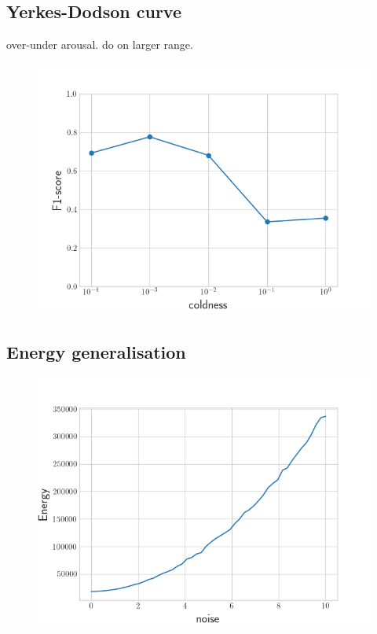 \subsection*{Yerkes-Dodson curve}
over-under arousal. do on larger range.
\begin{figure}[!ht]
\centering
\includegraphics[scale=0.5]{figures/yerkes-dodson}
\end{figure}

\subsection*{Energy generalisation}
\begin{figure}[!ht]
\centering
\includegraphics[scale=0.5]{figures/total-energy-model-1}
\end{figure}

